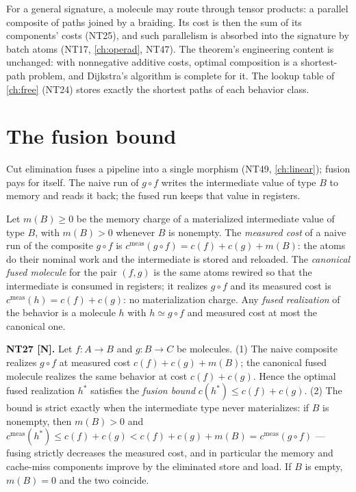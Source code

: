 \begin{remark}
For a general signature, a molecule may route through tensor products: a
parallel composite of paths joined by a braiding. Its cost is then the sum of
its components' costs (NT25), and such parallelism is absorbed into the
signature by batch atoms (NT17, \autoref{ch:operad}, NT47). The theorem's
engineering content is unchanged: with nonnegative additive costs, optimal
composition is a shortest-path problem, and Dijkstra's algorithm is complete
for it. The lookup table of \autoref{ch:free} (NT24) stores exactly the
shortest paths of each behavior class.
\end{remark}

\section{The fusion bound}\label{sec:enrich-fusion}

Cut elimination fuses a pipeline into a single morphism (NT49,
\autoref{ch:linear}); fusion pays for itself. The naive run of $g \circ f$
writes the intermediate value of type $B$ to memory and reads it back; the
fused run keeps that value in registers.

\begin{definition}\label{def:measured}
Let $m(B) \ge 0$ be the memory charge of a materialized intermediate value of
type $B$, with $m(B) > 0$ whenever $B$ is nonempty. The \emph{measured cost}
of a naive run of the composite $g \circ f$ is
$c^{\mathrm{meas}}(g \circ f) = c(f) + c(g) + m(B)$: the atoms do their nominal
work and the intermediate is stored and reloaded. The \emph{canonical fused
molecule} for the pair $(f, g)$ is the same atoms rewired so that the
intermediate is consumed in registers; it realizes $g \circ f$ and its
measured cost is $c^{\mathrm{meas}}(h) = c(f) + c(g)$: no materialization
charge. Any \emph{fused realization} of the behavior is a molecule $h$ with
$h \simeq g \circ f$ and measured cost at most the canonical one.
\end{definition}

\begin{theorem}\label{nt:27}
\textbf{NT27 [N].} Let $f \colon A \to B$ and $g \colon B \to C$ be molecules.
(1) The naive composite realizes $g \circ f$ at measured cost
$c(f) + c(g) + m(B)$; the canonical fused molecule realizes the same behavior
at cost $c(f) + c(g)$. Hence the optimal fused realization $h^{*}$ satisfies
the \emph{fusion bound} $c(h^{*}) \le c(f) + c(g)$.
(2) The bound is strict exactly when the intermediate type never materializes:
if $B$ is nonempty, then $m(B) > 0$ and
$c^{\mathrm{meas}}(h^{*}) \le c(f) + c(g) < c(f) + c(g) + m(B) =
c^{\mathrm{meas}}(g \circ f)$ --- fusing strictly decreases the measured cost,
and in particular the memory and cache-miss components improve by the
eliminated store and load. If $B$ is empty, $m(B) = 0$ and the two coincide.
\end{theorem}

